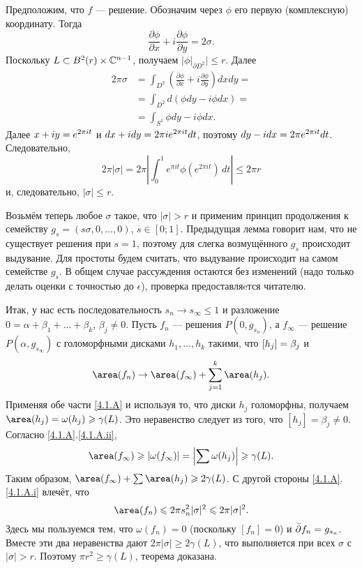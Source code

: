 Предположим, что $f$ — решение.
Обозначим через $\phi$ его первую (комплексную) координату.
Тогда 
\[\frac{\partial\phi}{\partial x}+i\frac{\partial\phi}{\partial y} = 2\sigma.\]
Поскольку $L \subset B^2 (r) \times \mathbb{C}^{n-1}$, получаем $\bigl|\phi|_{\partial D^2}\bigr|\le r$.
Далее
\begin{align*}
2\pi\sigma &= \int_{D^2}\left(\frac{\partial\phi}{\partial x}+i\frac{\partial\phi}{\partial y}\right)dxdy =
\\
&=\int_{D^2} d (\phi dy - i\phi dx)  = 
\\
&=\int_{S^1}\phi dy - i\phi dx.
\end{align*}
Далее $x + iy \z= e^{2\pi i t}$ и $dx + idy \z= 2\pi i e^{2\pi it} dt$, поэтому $dy - idx \z= 2\pi e^{2\pi i t} dt$.
Следовательно,
\[2\pi | \sigma | 
= 
2\pi\left|\int_0^1  e^{\pi i t} \phi(e^{2\pi i t})\,dt\right|
\le
2\pi r \]
и, следовательно, $| \sigma | \le r$.
\qeds


Возьмём теперь любое $\sigma$ такое, что $|\sigma|>r$ и применим принцип продолжения к семейству $g_s = (s\sigma, 0 ,\dots, 0)$, $s \in [0;1]$.
Предыдущая лемма говорит нам, что не существует решения при $s = 1$, поэтому для слегка возмущённого $g_s$ происходит выдувание.
Для простоты будем считать, что выдувание происходит на самом семействе $g_s$.
В общем случае рассуждения остаются без изменений (надо только делать оценки с точностью до $\epsilon$), проверка предоставляeтся читателю.

Итак, у нас есть последовательность $s_n \to s_\infty \le 1$ и разложение $0 = \alpha + \beta_1 +\dots+ \beta_k$, $\beta_j \ne 0$.
Пусть $f_n$ — решения $P (0, g_{s_n})$, а $f_\infty$ — решение $P
(\alpha, g_{s_\infty})$ с голоморфными дисками $h_1,\dots,h_k$ такими, что $[h_j] \z= \beta_j$ и
\[\area (f_n)
\to 
\area (f_\infty) + \sum_{j=1}^k\area (h_j).\]
Применяя обе части \ref{4.1.A} и используя то, что диски $h_j$
голоморфны, получаем
$\area (h_j) = \omega (h_j) \ge \gamma (L)$.
Это неравенство следует из того, что $[h_j] = \beta_j \ne 0$.
Согласно \ref{4.1.A}.\ref{4.1.A.ii},
\[\area (f_\infty)
\ge
|\omega(f_\infty)|
=
\left|\sum\omega (h_j)\right|
\ge
\gamma(L).\]
Таким образом, $\area (f_\infty) + \sum \area (h_j) \ge 2\gamma (L)$.
С другой стороны \ref{4.1.A}.\ref{4.1.A.i} влечёт, что 
\[\area(f_n)
\le
2\pi s^2_n|\sigma|^2
\le
2\pi|\sigma|^2.
\]
Здесь мы пользуемся тем, что $\omega (f_n) = 0$ (поскольку $[f_n] = 0$) и $\bar\partial f_n\z=g_{s_n}$.
Вместе эти два неравенства дают $2\pi | \sigma | \ge 2\gamma (L)$, что выполняется при всех $\sigma$ с $| \sigma | > r$.
Поэтому $\pi r^2 \ge \gamma (L)$, теорема доказана.
\qeds

